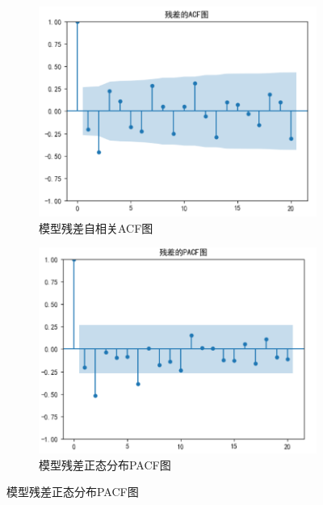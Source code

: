\documentclass{cumcmthesis}
\begin{document}
\begin{figure}[ht]
            \begin{subfigure}[b]{0.49\textwidth}
                \includegraphics[width=\textwidth]{graph/graph_6.png}
                \caption{模型残差自相关ACF图}
                \label{fig:image3}
            \end{subfigure}
            \hfill %
            \begin{subfigure}[b]{0.49\textwidth}
                \includegraphics[width=\textwidth]{graph/graph_5.png}
                \caption{模型残差正态分布PACF图}
                \label{fig:image4}
            \end{subfigure}
        \end{figure}
\end{document}
